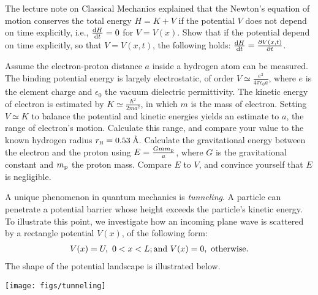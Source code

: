 The lecture note on Classical Mechanics
explained that
the Newton's equation of motion conserves the total energy $H = K + V$
if the potential $V$ does not depend on time explicitly, i.e.,
$\frac{{\rm d} H}{{\rm d}t} = 0$ for $V = V(x)$.
Show that if the potential depend on time explicitly, so that $V = V(x,t)$,
the following holds: $\frac{{\rm d} H}{{\rm d}t} = \frac{\partial V(x,t)}{\partial t}$.

\bigskip
{}
Assume the electron-proton distance $a$ inside a hydrogen atom can be measured.
The binding potential energy is largely electrostatic, of order $V \simeq \frac{e^2}{4\pi \epsilon_0 a}$,
where $e$ is the element charge and $\epsilon_0$ the vacuum dielectric permittivity.
The kinetic energy of electron is estimated by $K \simeq \frac{\hbar^2}{2ma^2}$,
in which $m$ is the mass of electron.
Setting $V \simeq K$ to balance the potential and kinetic energies yields an estimate to $a$,
the range of electron's motion.
Calculate this range, and compare your value to the known hydrogen radius $r_{\rm\scriptscriptstyle H} = 0.53\,$\AA.
Calculate the gravitational energy between the electron and the proton using $E = \frac{G m m_{\rm p}}{a}$,
where $G$ is the gravitational constant and $m_{\rm p}$ the proton mass.
Compare $E$ to $V$, and convince yourself that $E$ is negligible.

\bigskip
{}
A unique phenomenon in quantum mechanics is {\sl tunneling}.
A particle can penetrate a potential barrier whose height exceeds the particle's kinetic energy.
To illustrate this point, we investigate how an incoming plane wave is scattered by a rectangle potential $V(x)$,
of the following form:
\begin{eqnarray*}
V(x) = U,\ 0 < x < L;
{\rm and}\ V(x) = 0,\ {\rm otherwise}.
\end{eqnarray*}
The shape of the potential landscape is illustrated below.

\smallskip
\centerline{\texttt{[image: figs/tunneling]}}

